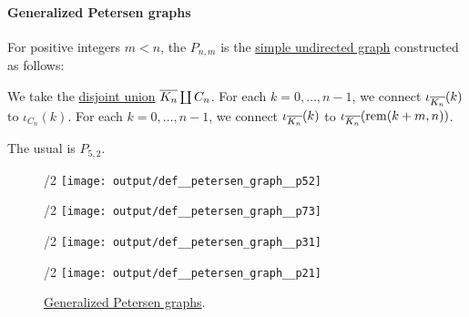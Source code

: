 \paragraph{Generalized Petersen graphs}

\begin{definition}\label{def:petersen_graph}
  For positive integers \( m < n \), the  \( P_{n,m} \) is the \hyperref[def:undirected_graph]{simple undirected graph} constructed as follows:
  \begin{thmenum}
     We take the \hyperref[def:graph_disjoint_union]{disjoint union} \( \oline{K_n} \coprod C_n \).
     For each \( k = 0, \ldots, n - 1 \), we connect \( \iota_{\oline{K_n}}(k) \) to \( \iota_{C_n}(k) \).
     For each \( k = 0, \ldots, n - 1 \), we connect \( \iota_{\oline{K_n}}(k) \) to \( \iota_{\oline{K_n}}(\rem(k + m, n)) \).
  \end{thmenum}

  The usual  is \( P_{5,2} \).

  \begin{figure}[!ht]
    \begin{subcaptionblock}{\textwidth/2}
      \centering
      \texttt{[image: output/def\_\_petersen\_graph\_\_p52]}
      \caption{\( P_{5,2} \)}\label{fig:def:petersen_graph/p52}
    \end{subcaptionblock}
    \hfill
    \begin{subcaptionblock}{\textwidth/2}
      \centering
      \texttt{[image: output/def\_\_petersen\_graph\_\_p73]}
      \caption{\( P_{7,3} \)}\label{fig:def:petersen_graph/p73}
    \end{subcaptionblock}
    \par
    \begin{subcaptionblock}{\textwidth/2}
      \centering
      \texttt{[image: output/def\_\_petersen\_graph\_\_p31]}
      \caption{\( P_{3,1} \)}\label{fig:def:petersen_graph/p31}
    \end{subcaptionblock}
    \hfill
    \begin{subcaptionblock}{\textwidth/2}
      \centering
      \texttt{[image: output/def\_\_petersen\_graph\_\_p21]}
      \caption{\( P_{2,1} \)}\label{fig:def:petersen_graph/p21}
    \end{subcaptionblock}

    \caption{\hyperref[def:petersen_graph]{Generalized Petersen graphs}.}\label{fig:def:petersen_graph}
  \end{figure}
\end{definition}

